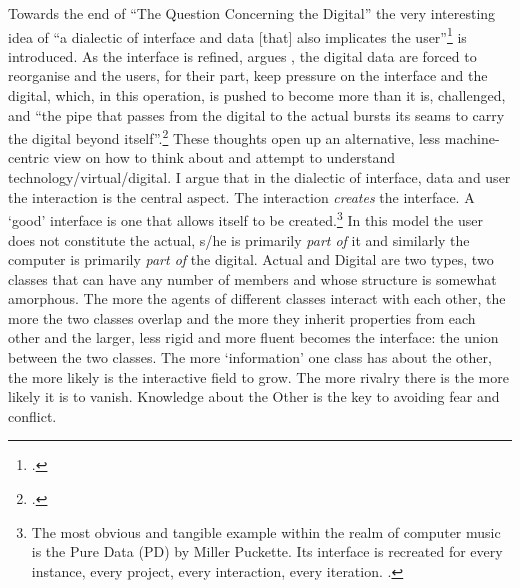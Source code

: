 \label{sec:interaction-digital-3}
Towards the end of ``The Question Concerning the Digital'' the very interesting idea of ``a dialectic of interface and data [that] also implicates the user''\footcite[80]{evens05} is introduced. As the interface is refined, argues \citeauthor{evens05}, the digital data are forced to reorganise and the users, for their part, keep pressure on the interface and the digital, which, in this operation, is pushed to become more than it is,  challenged, and ``the pipe that passes from the digital to the actual bursts its seams to carry the digital beyond itself''.\footcite[81]{evens05} These thoughts open up an alternative, less machine-centric view on how to think about and attempt to understand technology/virtual/digital. I argue that in the dialectic of interface, data and user the interaction is the central aspect. The interaction \emph{creates} the interface. A `good' interface is one that allows itself to be created.\footnote{The most obvious and tangible example within the realm of computer music is the Pure Data (PD) by Miller Puckette. Its interface is recreated for every instance, every project, every interaction, every iteration. \cites[See][]{puckette96}[and][]{puckette07}.} In this model the user does not constitute the actual, s/he is primarily \emph{part of} it and similarly the computer is primarily \emph{part of} the digital. Actual and Digital are two types, two classes that can have any number of members and whose structure is somewhat amorphous. The more the agents of different classes interact with each other, the more the two classes overlap and the more they inherit properties from each other and the larger, less rigid and more fluent becomes the interface: the union between the two classes. The more `information' one class has about the other, the more likely is the interactive field to grow. The more rivalry there is the more likely it is to vanish. Knowledge about the Other is the key to avoiding fear and conflict.

